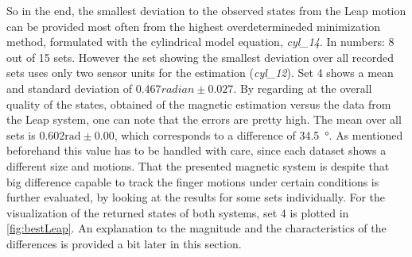 So in the end, the smallest deviation to the observed states from the Leap motion can be provided most often from the highest overdetermineded minimization method, formulated with the cylindrical model equation, \emph{cyl\_14}. In numbers: 8 out of 15 sets. However the set showing the smallest deviation over all recorded sets uses only two sensor units for the estimation (\emph{cyl\_12}). Set 4 shows a mean and standard deviation of $ 0.467 \si{radian} \pm 0.027 $. By regarding at the overall quality of the states, obtained of the magnetic estimation versus the data from the Leap system, one can note that the errors are pretty high. The mean over all sets is $ 0.602 \si{\radian} \pm 0.00 $, which corresponds to a difference of \SI{34.5}{\degree}. As mentioned beforehand this value has to be handled with care, since each dataset shows a different size and motions. That the presented magnetic system is despite that big difference capable to track the finger motions under certain conditions is further evaluated, by looking at the results for some sets individually. For the visualization of the returned states of both systems, set 4 is plotted in \ref{fig:bestLeap}. An explanation to the magnitude and the characteristics of the differences is provided a bit later in this section. 

